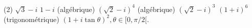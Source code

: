 %
%
	\begin{tasks}(2)
		\task $\sqrt{3} - i$
		\task $1 - i$
		\task (algébrique) $(\sqrt{2} - i)^4$
		\task (algébrique) $(\sqrt{2} - i)^3$
		\task $(1+i)^6$
		\task (trigonométrique)	$ (1 + i\tan{\theta})^2, \theta \in [0, \pi/2 [ $.
	\end{tasks}
